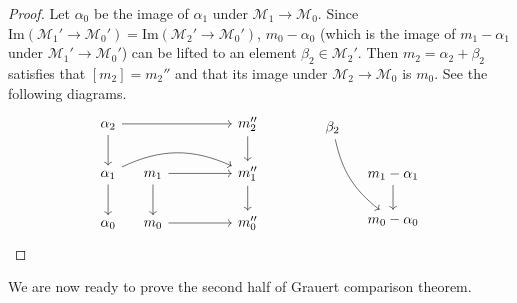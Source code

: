 \documentclass[12pt,b5paper,notitlepage]{report}
\theoremstyle{definition}
\theoremstyle{plain}
\newcommand{\mc}{\mathcal}
\newcommand{\Imag}{\mathrm{Im}}
\numberwithin{equation}{section}
\begin{document}
\begin{proof}
Let $\alpha_0$ be the image of $\alpha_1$ under $\mc M_1\rightarrow\mc M_0$. Since $\Imag(\mc M_1'\rightarrow\mc M_0')=\Imag(\mc M_2'\rightarrow \mc M_0')$, $m_0-\alpha_0$ (which is the image of $m_1-\alpha_1$ under $\mc M_1'\rightarrow\mc M_0'$) can be lifted to an element $\beta_2\in\mc M_2'$. Then $m_2=\alpha_2+\beta_2$ satisfies that $[m_2]=m_2''$ and that its image under $\mc M_2\rightarrow\mc M_0$ is $m_0$. See the following diagrams.
\begin{equation*}
\begin{tikzcd}[column sep=0.4cm]
\alpha_2 \arrow[rrrrr] \arrow[d]            &            &     &         &  & m_2'' \arrow[d] \\
\alpha_1 \arrow[d] \arrow[rrrrr, bend left=25] & m_1 \arrow[rrrr] \arrow[d] & && & m_1'' \arrow[d] \\
\alpha_0                                  & m_0 \arrow[rrrr]           & && & m_0''          
\end{tikzcd}
\qquad\qquad
\begin{tikzcd}[column sep=0.4cm]
\beta_2 \arrow[rdd, bend right=20] &                        \\
                                & m_1-\alpha_1 \arrow[d] \\
                                & m_0-\alpha_0          
\end{tikzcd}
\end{equation*}
\end{proof}


We are now ready to prove the second half of Grauert comparison theorem.
\end{document}
